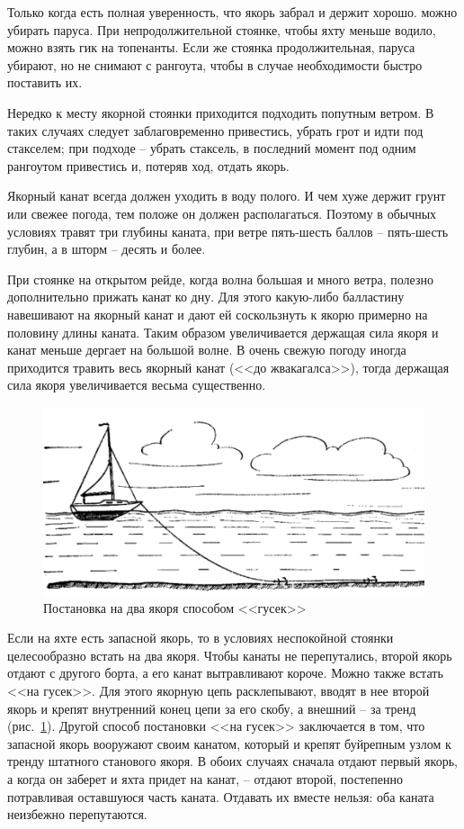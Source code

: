\documentclass[a4paper, 12pt, twoside, final]{scrbook}
\begin{document}
Только когда есть полная уверенность, что якорь забрал и держит хорошо. можно убирать паруса. При непродолжительной стоянке, чтобы яхту меньше водило, можно взять гик на топенанты. Если же стоянка продолжительная, паруса убирают, но не снимают с рангоута, чтобы в случае необходимости быстро поставить их.

Нередко к месту якорной стоянки приходится подходить попутным ветром. В таких случаях следует заблаговременно привестись, убрать грот и идти под стакселем; при подходе \--- убрать стаксель, в последний момент под одним рангоутом привестись и, потеряв ход, отдать якорь.

Якорный канат всегда должен уходить в воду полого. И чем хуже держит грунт или свежее погода, тем положе он должен располагаться. Поэтому в обычных условиях травят три глубины каната, при ветре пять\--шесть баллов \--- пять\--шесть глубин, а в шторм \--- десять и более.

При стоянке на открытом рейде, когда волна большая и много ветра, полезно дополнительно прижать канат ко дну. Для этого какую-либо балластину навешивают на якорный канат и дают ей соскользнуть к якорю примерно на половину длины каната. Таким образом увеличивается держащая сила якоря и канат меньше дергает на большой волне. В очень свежую погоду иногда приходится травить весь якорный канат (<<до жвакагалса>>), тогда держащая сила якоря увеличивается весьма существенно.

\begin{figure}[htbp]
   \centering
   \includegraphics{pics/129_Postanovka_na_gusek} %
   \caption{Постановка на два якоря способом <<гусек>>}
   \label{fig:129}
\end{figure}

Если на яхте есть запасной якорь, то в условиях неспокойной стоянки целесообразно встать на два якоря. Чтобы канаты не перепутались, второй якорь отдают с другого борта, а его канат вытравливают короче. Можно также встать <<на гусек>>. Для этого якорную цепь расклепывают, вводят в нее второй якорь и крепят внутренний конец цепи за его скобу, а внешний \--- за тренд (рис.~\ref{fig:129}). Другой способ постановки <<на гусек>> заключается в том, что запасной якорь вооружают своим канатом, который и крепят буйрепным узлом к тренду штатного станового якоря. В обоих случаях сначала отдают первый якорь, а когда он заберет и яхта придет на канат, \--- отдают второй, постепенно потравливая оставшуюся часть каната. Отдавать их вместе нельзя: оба каната неизбежно перепутаются.
\end{document}
